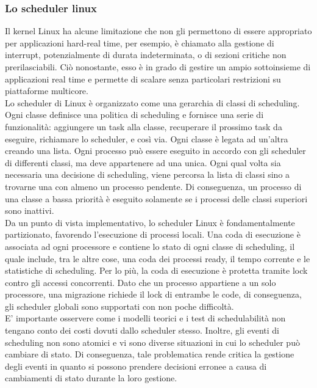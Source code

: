 \subsubsection{Lo scheduler linux}
\label{sec:intro.linuxSched}

Il kernel Linux ha alcune limitazione che non gli permettono di essere appropriato per applicazioni hard-real time, per esempio, è chiamato alla gestione di interrupt, potenzialmente di durata indeterminata, o di sezioni critiche non prerilasciabili. Ciò nonostante, esso è in grado di gestire un ampio sottoinsieme di applicazioni real time e permette di scalare senza particolari restrizioni su piattaforme multicore.\\

Lo scheduler di Linux è organizzato come una gerarchia di classi di scheduling. Ogni classe definisce una politica di scheduling e fornisce una serie di funzionalità: aggiungere un task alla classe, recuperare il prossimo task da eseguire, richiamare lo scheduler, e così via. Ogni classe è legata ad un'altra creando una lista. Ogni processo può essere eseguito in accordo con gli scheduler di differenti classi, ma deve appartenere ad una unica. Ogni qual volta sia necessaria una decisione di scheduling, viene percorsa la lista di classi sino a trovarne una con almeno un processo pendente. Di conseguenza, un processo di una classe a bassa priorità è eseguito solamente se i processi delle classi superiori sono inattivi.\\

Da un punto di vista implementativo, lo scheduler Linux è fondamentalmente partizionato, favorendo l'esecuzione di processi locali. Una coda di esecuzione è associata ad ogni processore e contiene lo stato di ogni classe di scheduling, il quale include, tra le altre cose, una coda dei processi ready, il tempo corrente e le statistiche di scheduling. Per lo più, la coda di esecuzione è protetta tramite lock contro gli accessi concorrenti. Dato che un processo appartiene a un solo processore, una migrazione richiede il lock di entrambe le code, di conseguenza, gli scheduler globali sono supportati con non poche difficoltà.\\

E' importante osservere come i modelli teorici e i test di schedulabilità non tengano conto dei costi dovuti dallo scheduler stesso. Inoltre, gli eventi di scheduling non sono atomici e vi sono diverse situazioni in cui lo scheduler può cambiare di stato. Di conseguenza, tale problematica rende critica la gestione degli eventi in quanto si possono prendere decisioni erronee a causa di cambiamenti di stato durante la loro gestione.

